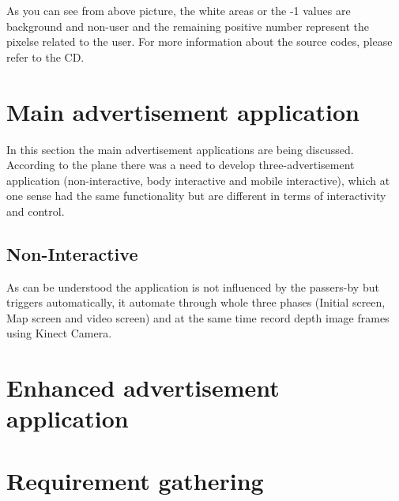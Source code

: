 As you can see from above picture, the white areas or the -1 values are background and non-user and the remaining positive number represent the pixelse related to the user.
For more information about the source codes, please refer to the CD.


\section{Main advertisement application}
In this section the main advertisement applications are being discussed.
According to the plane there was a need to develop three-advertisement application (non-interactive, body interactive and mobile interactive), which at one sense had the same functionality but are different in terms of interactivity and control.


\subsection{Non-Interactive}
As can be understood the application is not influenced by the passers-by but triggers automatically, it automate through whole three phases (Initial screen, Map screen and video screen) and at the same time record depth image frames using Kinect Camera.





\section{Enhanced advertisement application}


\section{Requirement gathering}

